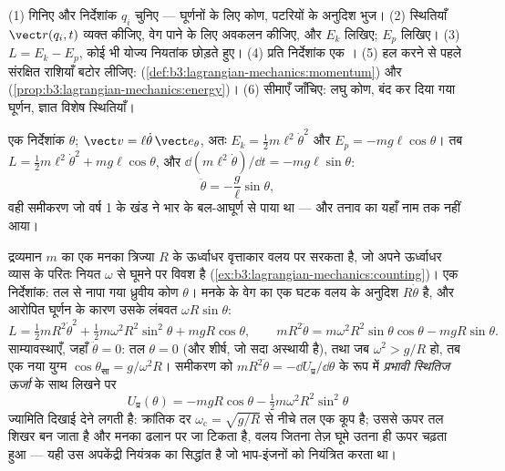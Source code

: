 \begin{method}[लाग्रांजियन विधि]\label{met:b3:lagrangian-mechanics:recipe}
(1)  गिनिए और निर्देशांक $q_i$ चुनिए ---
घूर्णनों के लिए कोण, पटरियों के अनुदिश भुज। (2) स्थितियाँ
$\vect r(q_i, t)$ व्यक्त कीजिए, वेग पाने के लिए अवकलन कीजिए, और
$E_k$ लिखिए; $E_p$ लिखिए। (3) $L = E_k - E_p$, कोई भी योज्य नियतांक
छोड़ते हुए। (4) प्रति निर्देशांक एक । (5) हल करने
से पहले संरक्षित राशियाँ बटोर लीजिए: 
(\cref{def:b3:lagrangian-mechanics:momentum}) और 
(\cref{prop:b3:lagrangian-mechanics:energy})। (6) सीमाएँ जाँचिए: लघु
कोण, बंद कर दिया गया घूर्णन, ज्ञात विशेष स्थितियाँ।
\end{method}

\begin{example}[लोलक, तीन पंक्तियों में]\label{ex:b3:lagrangian-mechanics:pendulum}
एक निर्देशांक $\theta$; $\vect v = \ell\dot\theta\,\vect e_\theta$, अतः
$E_k = \tfrac12 m\ell^2\dot\theta^2$ और $E_p = -mg\ell\cos\theta$।
तब $L = \tfrac12 m\ell^2\dot\theta^2 + mg\ell\cos\theta$, और
$\dd(m\ell^2\dot\theta)/\dd t = -mg\ell\sin\theta$:
\[
\ddot\theta = -\frac{g}{\ell}\sin\theta ,
\]
वही समीकरण जो वर्ष 1 के खंड ने भार के बल-आघूर्ण से पाया था --- और तनाव
का यहाँ नाम तक नहीं आया।
\end{example}

\begin{example}\label{ex:b3:lagrangian-mechanics:hoop}
द्रव्यमान $m$ का एक मनका त्रिज्या $R$ के ऊर्ध्वाधर वृत्ताकार वलय पर
सरकता है, जो अपने ऊर्ध्वाधर व्यास के परितः नियत $\omega$ से घूमने पर
विवश है (\cref{ex:b3:lagrangian-mechanics:counting})। एक निर्देशांक:
तल से नापा गया ध्रुवीय कोण $\theta$। मनके के वेग का एक घटक वलय के
अनुदिश $R\dot\theta$ है, और आरोपित घूर्णन के कारण उसके लंबवत
$\omega R\sin\theta$:
\[
L = \tfrac12 mR^2\dot\theta^2 + \tfrac12 m\omega^2R^2\sin^2\theta
 + mgR\cos\theta ,
\qquad
mR^2\ddot\theta = m\omega^2R^2\sin\theta\cos\theta - mgR\sin\theta .
\]
साम्यावस्थाएँ, जहाँ $\ddot\theta = 0$: तल $\theta = 0$ (और शीर्ष, जो
सदा अस्थायी है), तथा जब $\omega^2 > g/R$ हो, तब एक नया युग्म
$\cos\theta_{\text{सा}} = g/\omega^2R$। समीकरण को
$mR^2\ddot\theta = -\dd U_{\text{प्र}}/\dd\theta$ के रूप में
\emph{प्रभावी स्थितिज ऊर्जा} के साथ लिखने पर
\[
U_{\text{प्र}}(\theta) = -mgR\cos\theta
 - \tfrac12 m\omega^2R^2\sin^2\theta
\]
ज्यामिति दिखाई देने लगती है: क्रांतिक दर
$\omega_{\text{c}} = \sqrt{g/R}$ से नीचे तल एक कूप है; उससे ऊपर तल शिखर
बन जाता है और मनका ढलान पर जा टिकता है, वलय जितना तेज़ घूमे उतना ही ऊपर
चढ़ता हुआ --- यही उस अपकेंद्री नियंत्रक का सिद्धांत है जो भाप-इंजनों को
नियंत्रित करता था।
\end{example}

